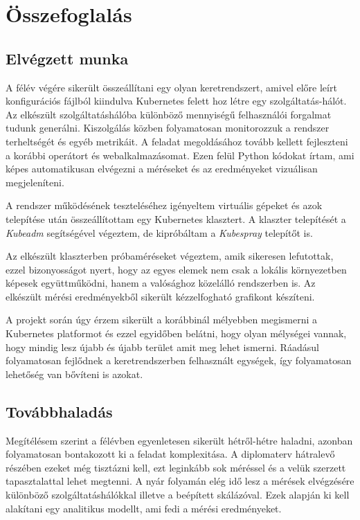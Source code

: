 \chapter{Összefoglalás}
\label{sec:summary}


\section{Elvégzett munka}

A félév végére sikerült összeállítani egy olyan keretrendszert, amivel előre leírt konfigurációs
fájlból kiindulva Kubernetes felett hoz létre egy szolgáltatás-hálót. Az elkészült
szolgáltatáshálóba különböző mennyiségű felhasználói forgalmat tudunk generálni. Kiszolgálás közben
folyamatosan monitorozzuk a rendszer terheltségét és egyéb metrikáit. A feladat megoldásához tovább kellett fejleszteni a korábbi operátort és webalkalmazásomat. Ezen felül Python kódokat írtam, ami képes automatikusan elvégezni a méréseket és az eredményeket vizuálisan megjeleníteni.

A rendszer működésének teszteléséhez igényeltem virtuális gépeket és azok telepítése után összeállítottam egy Kubernetes klasztert. A klaszter telepítését a \textit{Kubeadm} segítségével végeztem, de kipróbáltam a \textit{Kubespray} telepítőt is. 

Az elkészült klaszterben próbaméréseket végeztem, amik sikeresen lefutottak, ezzel bizonyosságot nyert, hogy az egyes elemek nem csak a lokális környezetben képesek együttműködni, hanem a valósághoz közelálló rendszerben is. Az elkészült mérési eredményekből  sikerült kézzelfogható grafikont készíteni. 

A projekt során úgy érzem sikerült a korábbinál mélyebben megismerni a Kubernetes platformot és ezzel egyidőben belátni, hogy olyan mélységei vannak, hogy mindig lesz újabb és újabb terület amit meg lehet ismerni. Ráadásul folyamatosan fejlődnek a keretrendszerben felhasznált egységek, így folyamatosan lehetőség van bővíteni is azokat.

\section{Továbbhaladás}
Megítélésem szerint a félévben egyenletesen sikerült hétről-hétre haladni, azonban folyamatosan bontakozott ki a feladat komplexitása. A diplomaterv hátralevő részében ezeket még tisztázni kell, ezt leginkább sok méréssel és a velük szerzett tapasztalattal lehet megtenni. A nyár folyamán elég idő lesz a mérések elvégzésére különböző szolgáltatáshálókkal illetve a beépített skálázóval. Ezek alapján ki kell alakítani egy analitikus modellt, ami fedi a mérési eredményeket. 

